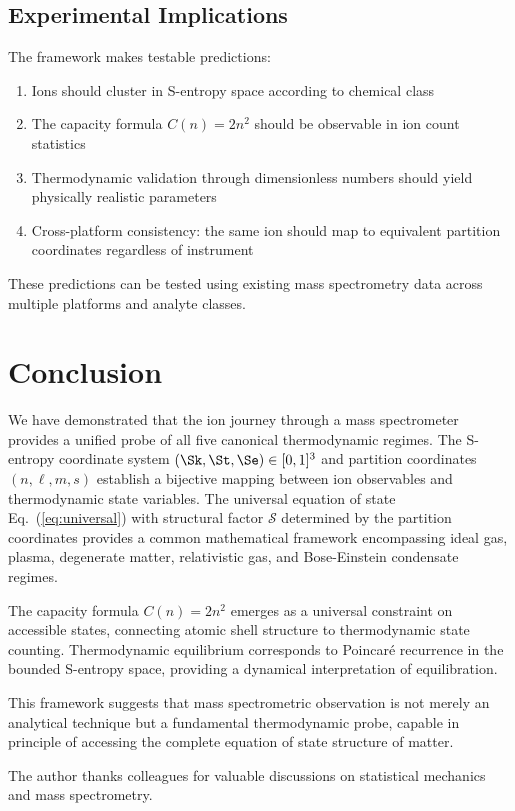 \subsection{Experimental Implications}

The framework makes testable predictions:
\begin{enumerate}
    \item Ions should cluster in S-entropy space according to chemical class
    \item The capacity formula $C(n) = 2n^2$ should be observable in ion count statistics
    \item Thermodynamic validation through dimensionless numbers should yield physically realistic parameters
    \item Cross-platform consistency: the same ion should map to equivalent partition coordinates regardless of instrument
\end{enumerate}

These predictions can be tested using existing mass spectrometry data across multiple platforms and analyte classes.

\section{Conclusion}

We have demonstrated that the ion journey through a mass spectrometer provides a unified probe of all five canonical thermodynamic regimes. The S-entropy coordinate system $(\Sk, \St, \Se) \in [0,1]^3$ and partition coordinates $(n, \ell, m, s)$ establish a bijective mapping between ion observables and thermodynamic state variables. The universal equation of state Eq.~(\ref{eq:universal}) with structural factor $\mathcal{S}$ determined by the partition coordinates provides a common mathematical framework encompassing ideal gas, plasma, degenerate matter, relativistic gas, and Bose-Einstein condensate regimes.

The capacity formula $C(n) = 2n^2$ emerges as a universal constraint on accessible states, connecting atomic shell structure to thermodynamic state counting. Thermodynamic equilibrium corresponds to Poincar\'{e} recurrence in the bounded S-entropy space, providing a dynamical interpretation of equilibration.

This framework suggests that mass spectrometric observation is not merely an analytical technique but a fundamental thermodynamic probe, capable in principle of accessing the complete equation of state structure of matter.

\begin{acknowledgments}
The author thanks colleagues for valuable discussions on statistical mechanics and mass spectrometry.
\end{acknowledgments}

